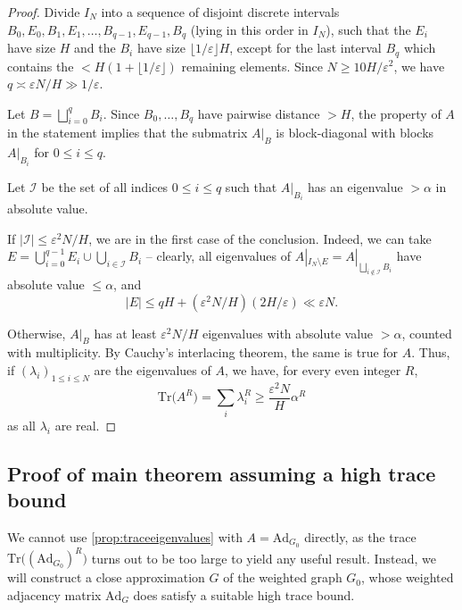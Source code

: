 \documentclass[11pt]{amsart}
\theoremstyle{definition}
\renewcommand{\leq}{\leqslant}
\renewcommand{\ge}{\geqslant}
\renewcommand{\geq}{\geqslant}
\newcommand{\eps}{\varepsilon}
\newcommand{\Ad}{\mathrm{Ad}}
\newcommand{\Tr}{\mathrm{Tr}}
\newcommand{\N}{I_N}
\newcommand{\graph}{G}
\newcommand{\indexset}{\mathcal{I}}
\newcommand{\tupsize}{R}
\begin{document}
\begin{proof}
Divide $\N$ into a sequence of disjoint discrete intervals $B_0, E_0, B_1, E_1, \ldots, B_{q-1}, E_{q-1}, B_q$ (lying in this order in $\N$), such that the $E_i$ have size $H$ and the $B_i$ have size $\lfloor 1/\eps \rfloor H$, except for the last interval $B_q$ which contains the $<H(1+\lfloor 1/\eps \rfloor )$ remaining elements. Since $N\ge 10H/\eps^2$, we have $q\asymp \eps N/H\gg 1/\eps$.

Let $B = \bigsqcup_{i=0}^q B_i$. Since $B_0, \ldots, B_q$ have pairwise distance $> H$, the property of $A$ in the statement implies that the submatrix $A|_{B}$ is block-diagonal with blocks $A|_{B_i}$ for $0\leq i\leq q$. 

Let $\indexset$ be the set of all indices $0\leq i\leq q$ such that $A|_{B_i}$ has an eigenvalue $>\alpha$ in absolute value. 

If $| \indexset | \leq \eps^2N/H$, we are in the first case of the conclusion. Indeed, we can take $E = \bigcup_{i=0}^{q-1}E_i \cup \bigcup_{i\in \indexset} B_i$ -- clearly, all eigenvalues of $A|_{\N \setminus E} = A|_{\bigsqcup_{i\not\in \indexset}B_i}$ have absolute value $\leq \alpha$, and 
\begin{equation*}
|E| \leq qH + (\eps^2N/H) (2H/\eps) \ll \eps N.
\end{equation*}

Otherwise, $A|_{B}$ has at least $\eps^2N/H$ eigenvalues with absolute value $>\alpha$, counted with multiplicity. By Cauchy's interlacing theorem, the same is true for $A$. Thus, if $(\lambda_i)_{1\leq i\leq N}$ are the eigenvalues of $A$, we have, for every even integer $\tupsize$,
\begin{equation*}
	\Tr \big(A^{\tupsize}\big) = \sum_{i} \lambda_i^{\tupsize} \geq \frac{\eps^2N}{H} \alpha^{\tupsize}
\end{equation*}
as all $\lambda_i$ are real.
\end{proof}



\subsection{Proof of main theorem assuming a high trace bound}

We cannot use \cref{prop:traceeigenvalues} with $A = \Ad_{\graph_0}$ directly, as the trace $\Tr\big((\Ad_{\graph_0})^{\tupsize}\big)$ turns out to be too large to yield any useful result. Instead, we will construct a close approximation $\graph$ of the weighted graph $\graph_0$, whose weighted adjacency matrix  $\Ad_{\graph}$ does satisfy a suitable high trace bound.
\end{document}
